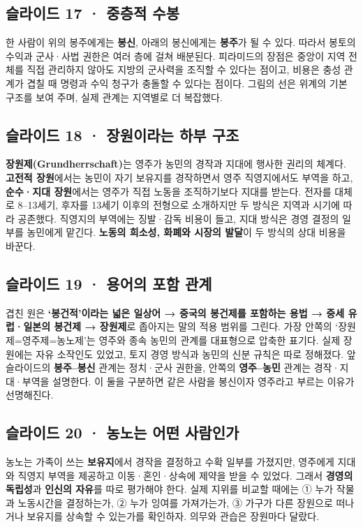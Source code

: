 \documentclass[10pt,a4paper]{article}
\begin{document}
\subsection{슬라이드 17 · 중층적 수봉}
한 사람이 위의 봉주에게는 \textbf{봉신}, 아래의 봉신에게는 \textbf{봉주}가 될 수 있다. 따라서 봉토의 수익과 군사·사법 권한은 여러 층에 걸쳐 배분된다. 피라미드의 장점은 중앙이 지역 전체를 직접 관리하지 않아도 지방의 군사력을 조직할 수 있다는 점이고, 비용은 충성 관계가 겹칠 때 명령과 수익 청구가 충돌할 수 있다는 점이다. 그림의 선은 위계의 기본 구조를 보여 주며, 실제 관계는 지역별로 더 복잡했다.\par

\subsection{슬라이드 18 · 장원이라는 하부 구조}
\textbf{장원제(Grundherrschaft)}는 영주가 농민의 경작과 지대에 행사한 권리의 체계다. \textbf{고전적 장원}에서는 농민이 자기 보유지를 경작하면서 영주 직영지에서도 부역을 하고, \textbf{순수·지대 장원}에서는 영주가 직접 노동을 조직하기보다 지대를 받는다. 전자를 대체로 8–13세기, 후자를 13세기 이후의 전형으로 소개하지만 두 방식은 지역과 시기에 따라 공존했다. 직영지의 부역에는 징발·감독 비용이 들고, 지대 방식은 경영 결정의 일부를 농민에게 맡긴다. \textbf{노동의 희소성, 화폐와 시장의 발달}이 두 방식의 상대 비용을 바꾼다.\par

\subsection{슬라이드 19 · 용어의 포함 관계}
겹친 원은 \textbf{‘봉건적’이라는 넓은 일상어 → 중국의 봉건제를 포함하는 용법 → 중세 유럽·일본의 봉건제 → 장원제}로 좁아지는 말의 적용 범위를 그린다. 가장 안쪽의 ‘장원제=영주제=농노제’는 영주와 종속 농민의 관계를 대표형으로 압축한 표기다. 실제 장원에는 자유 소작인도 있었고, 토지 경영 방식과 농민의 신분 규칙은 따로 정해졌다. 앞 슬라이드의 \textbf{봉주–봉신} 관계는 정치·군사 권한을, 안쪽의 \textbf{영주–농민} 관계는 경작·지대·부역을 설명한다. 이 둘을 구분하면 같은 사람을 봉신이자 영주라고 부르는 이유가 선명해진다.\par

\subsection{슬라이드 20 · 농노는 어떤 사람인가}
농노는 가족이 쓰는 \textbf{보유지}에서 경작을 결정하고 수확 일부를 가졌지만, 영주에게 지대와 직영지 부역을 제공하고 이동·혼인·상속에 제약을 받을 수 있었다. 그래서 \textbf{경영의 독립성}과 \textbf{인신의 자유}를 따로 평가해야 한다. 실제 지위를 비교할 때에는 ① 누가 작물과 노동시간을 결정하는가, ② 누가 잉여를 가져가는가, ③ 가구가 다른 장원으로 떠나거나 보유지를 상속할 수 있는가를 확인하자. 의무와 관습은 장원마다 달랐다.\par
\end{document}

